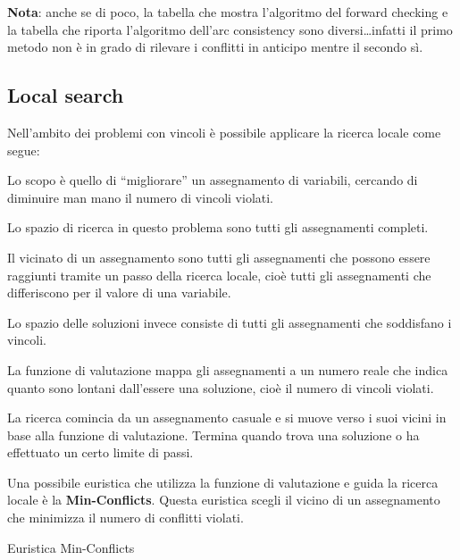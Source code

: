 \textbf{Nota}: anche se di poco, la tabella che mostra l'algoritmo del forward
checking e la tabella che riporta l'algoritmo dell'arc consistency sono
diversi\dots infatti il primo metodo non è in grado di rilevare i conflitti
in anticipo mentre il secondo sì.

\subsection{Local search}

Nell'ambito dei problemi con vincoli è possibile applicare la ricerca
locale come segue:

Lo scopo è quello di ``migliorare'' un assegnamento di variabili, cercando di
diminuire man mano il numero di vincoli violati.

Lo spazio di ricerca in questo problema sono tutti gli assegnamenti completi.

Il vicinato di un assegnamento sono tutti gli assegnamenti che possono essere
raggiunti tramite un passo della ricerca locale, cioè tutti gli assegnamenti
che differiscono per il valore di una variabile.

Lo spazio delle soluzioni invece consiste di tutti gli assegnamenti che
soddisfano i vincoli.

La funzione di valutazione mappa gli assegnamenti a un numero reale che indica
quanto sono lontani dall'essere una soluzione, cioè il numero di vincoli
violati.

La ricerca comincia da un assegnamento casuale e si muove verso i suoi vicini
in base alla funzione di valutazione. Termina quando trova una soluzione o
ha effettuato un certo limite di passi.

Una possibile euristica che utilizza la funzione di valutazione e guida la
ricerca locale è la \textbf{Min-Conflicts}. Questa euristica scegli il vicino
di un assegnamento che minimizza il numero di conflitti violati.

\begin{algorithm}
    \caption{Euristica Min-Conflicts}
    \label{alg:minconflicts}
    \begin{algorithmic}[1]
              \EndIf
            \EndFor
        \EndProcedure
    \end{algorithmic}
\end{algorithm}

